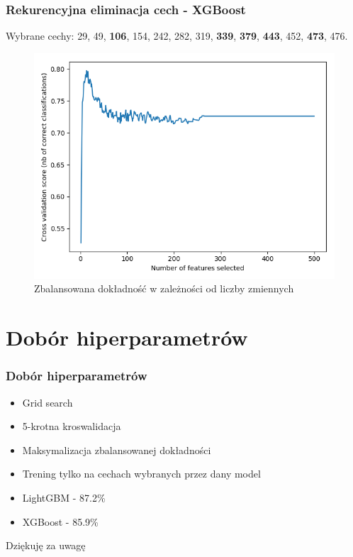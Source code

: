 \documentclass{beamer}
\begin{document}
    \begin{frame}
        \frametitle{Rekurencyjna eliminacja cech - XGBoost}
        Wybrane cechy: 29, 49, \textbf{106}, 154, 242, 282, 319, \textbf{339}, \textbf{379}, \textbf{443}, 452, \textbf{473}, 476.
        \begin{figure}[h!]
            \centering
            \includegraphics[width=0.75\linewidth]{../images/xgboost-rfe-cv.png}
            \caption{Zbalansowana dokładność w zależności od liczby zmiennych}
            \label{fig:rfe-cv-xgboost}
        \end{figure}
    \end{frame}

    \section{Dobór hiperparametrów}

    \begin{frame}
        \frametitle{Dobór hiperparametrów}
        \begin{itemize}
            \item Grid search
            \item 5-krotna kroswalidacja
            \item Maksymalizacja zbalansowanej dokładności
            \item Trening tylko na cechach wybranych przez dany model
            \item LightGBM - 87.2\%
            \item XGBoost - 85.9\%
        \end{itemize}
    \end{frame}

    \begin{frame}[standout]
        \centering
        Dziękuję za uwagę
    \end{frame}
\end{document}
